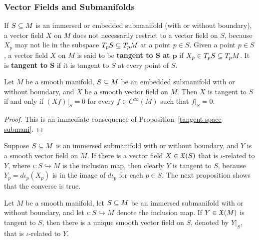 \subsubsection{Vector Fields and Submanifolds}
If $S\subseteq M$ is an immersed or embedded submanifold (with or without boundary), a vector field $X$ on $M$ does not necessarily restrict to a vector field on $S$, because $X_p$ may not lie in the subspace $T_pS\subseteq T_pM$ at a point $p\in S$. Given a point $p\in S$, a vector field $X$ on $M$ is said to be \textbf{tangent to $\bm{S}$ at $\bm{p}$} if $X_p\in T_pS\subseteq T_pM$. It is \textbf{tangent to $\bm{S}$} if it is tangent to $S$ at every point of $S$.
\begin{proposition}\label{vector field tangent iff}
Let $M$ be a smooth manifold, $S\subseteq M$ be an embedded submanifold with or without boundary, and $X$ be a smooth vector field on $M$. Then $X$ is tangent to $S$ if and only if $(Xf)|_S=0$ for every $f\in C^\infty(M)$ such that $f|_S=0$.
\end{proposition}
\begin{proof}
This is an immediate consequence of Proposition~\ref{tangent space submani}.
\end{proof}
Suppose $S\subseteq M$ is an immersed submanifold with or without boundary, and $Y$
is a smooth vector field on $M$. If there is a vector field $X\in\mathfrak{X}(S)$ that is $\iota$-related to $Y$, where $\iota:S\hookrightarrow M$ is the inclusion map, then clearly $Y$ is tangent to $S$, because $Y_p=d\iota_p(X_p)$ is in the image of $d\iota_p$ for each $p\in S$. The next proposition shows that the converse is true.
\begin{proposition}\label{vector field restrict submani}
Let $M$ be a smooth manifold, let $S\subseteq M$ be an immersed submanifold with or without boundary, and let $\iota:S\hookrightarrow M$ denote the inclusion map. If $Y\in\mathfrak{X}(M)$ is tangent to $S$, then there is a unique smooth vector field on $S$, denoted by $Y|_S$, that is $\iota$-related to $Y$.
\end{proposition}
